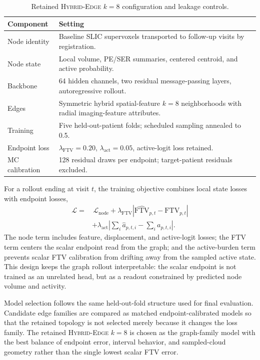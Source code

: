 \documentclass[journal,twoside,print]{ieeecolor}
\newcommand{\ftv}{\mathrm{FTV}}
\newcommand{\modeltag}{\textsc{Hybrid-Edge} $k=8$}
\begin{document}
\begin{table}[t]
\centering
\caption{Retained \modeltag{} configuration and leakage controls.}
\label{tab:methodconfig}
\scriptsize
\setlength{\tabcolsep}{3.0pt}
\begin{tabularx}{\columnwidth}{@{}lX@{}}
\toprule
Component & Setting \\
\midrule
Node identity & Baseline SLIC supervoxels transported to follow-up visits by registration. \\
Node state & Local volume, PE/SER summaries, centered centroid, and active probability. \\
Backbone & 64 hidden channels, two residual message-passing layers, autoregressive rollout. \\
Edges & Symmetric hybrid spatial-feature $k=8$ neighborhoods with radial imaging-feature attributes. \\
Training & Five held-out-patient folds; scheduled sampling annealed to 0.5. \\
Endpoint loss & $\lambda_{\ftv}=0.20$, $\lambda_{\mathrm{act}}=0.05$, active-logit loss retained. \\
MC calibration & 128 residual draws per endpoint; target-patient residuals excluded. \\
\bottomrule
\end{tabularx}
\end{table}

For a rollout ending at visit $t$, the training objective combines local state
losses with endpoint losses,
\begin{equation}
\begin{split}
\mathcal{L} =
&\,\mathcal{L}_{\mathrm{node}}+
\lambda_{\ftv}\left|\widehat{\ftv}_{p,t}-\ftv_{p,t}\right|\\
&+\lambda_{\mathrm{act}}
\left|\sum_i \widehat{a}_{p,t,i}-\sum_i a_{p,t,i}\right|.
\end{split}
\end{equation}
The node term includes feature, displacement, and active-logit losses; the FTV
term centers the scalar endpoint read from the graph; and the active-burden
term prevents scalar FTV calibration from drifting away from the sampled active
state. This design keeps the graph rollout interpretable: the scalar endpoint
is not trained as an unrelated head, but as a readout constrained by predicted
node volume and activity.

Model selection follows the same held-out-fold structure used for final
evaluation. Candidate edge families are compared as matched endpoint-calibrated
models so that the retained topology is not selected merely because it changes
the loss family. The retained \modeltag{} is chosen as the graph-family model
with the best balance of endpoint error, interval behavior, and sampled-cloud
geometry rather than the single lowest scalar FTV error.
\end{document}
